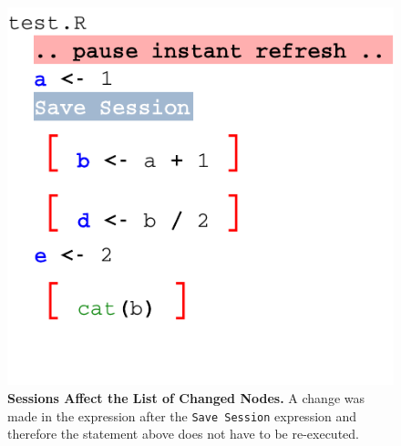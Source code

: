 \begin{figure}
  \centering
  \includegraphics[width=\figWidthSmall]{figures/IRPauseAndSessionExpression.pdf}
\caption[Sessions Affect the List of Changed Nodes]{\textbf{Sessions Affect the List of Changed Nodes.} A change was made in the expression after the \texttt{Save Session} expression and therefore the statement above does not have to be re-executed.}
\end{figure}
